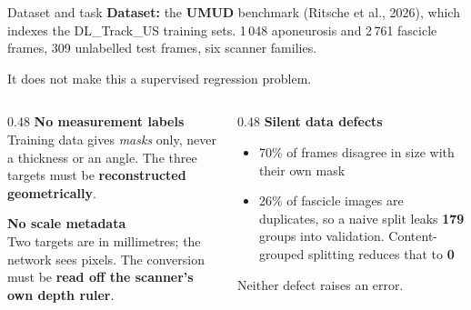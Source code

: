 \documentclass[aspectratio=169,11pt]{beamer}
\newcommand{\hl}[1]{\textcolor{Accent}{\textbf{#1}}}
\newcommand{\num}[1]{\textcolor{Ink}{\textbf{#1}}}
\begin{document}
\begin{frame}{Dataset and task}
  \small\textbf{Dataset:} the \hl{UMUD} benchmark (Ritsche et al., 2026), which
  indexes the DL\_Track\_US training sets.
  \textcolor{Muted}{1\,048 aponeurosis and 2\,761 fascicle frames, 309 unlabelled
  test frames, six scanner families.}\normalsize
  \vspace{0.1cm}

  It does not make this a supervised regression problem.
  \vspace{0.18cm}

  \begin{columns}[T]
  \begin{column}{0.48\textwidth}
    \textbf{\color{Red} No measurement labels}\\[0.15cm]
    {\footnotesize Training data gives \emph{masks} only, never a thickness or an angle.
    The three targets must be \hl{reconstructed geometrically}.}
    \vspace{0.22cm}

    \textbf{\color{Red} No scale metadata}\\[0.15cm]
    {\footnotesize Two targets are in millimetres; the network sees pixels. The
    conversion must be \hl{read off the scanner's own depth ruler}.}
  \end{column}
  \begin{column}{0.48\textwidth}
    \textbf{\color{Red} Silent data defects}\\[0.15cm]
    {\footnotesize
    \begin{itemize}\setlength\itemsep{0.15cm}
      \item 70\% of frames disagree in size with their own mask
      \item 26\% of fascicle images are duplicates, so a naive split leaks
            \num{179} groups into validation. Content-grouped splitting
            reduces that to \num{0}
    \end{itemize}
    Neither defect raises an error.}
  \end{column}
  \end{columns}

\end{frame}
\end{document}
